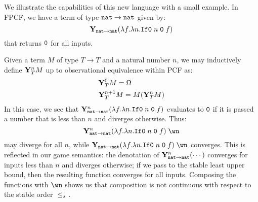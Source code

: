 \documentclass{article}
\begin{document}
\begin{example}
  We illustrate the capabilities of this new language with a small example.  In FPCF, we have a term of type ${\mathtt{nat}}\to{\mathtt{nat}}$ given by:
  \[
    \mathbf{Y}_{{\mathtt{nat}}\to{\mathtt{nat}}}(\lambda f.\lambda n.{\mathtt{If0}\;} n\;{\mathtt{0}}\;f)
    \]
  that returns ${\mathtt{0}}$ for all inputs.

  Given a term $M$ of type $T\to T$ and a natural number $n$, we may inductively define $\mathbf{Y}_T^n M$ up to observational equivalence within PCF as:
  \begin{align*}
    &\mathbf{Y}_T^0 M = \Omega \\
    &\mathbf{Y}_T^{n+1} M = M (\mathbf{Y}_T^n M)
  \end{align*}
  In this case, we see that $\mathbf{Y}_{{\mathtt{nat}}\to{\mathtt{nat}}}^n(\lambda f.\lambda n.{\mathtt{If0}\;} n\;{\mathtt{0}}\;f)$ evaluates to ${\mathtt{0}}$ if it is passed a number that is less than $n$ and diverges otherwise.  Thus:
  \[
    \Y_{\nat\to\nat}^n(\lambda f.\lambda n.\IfO n\;\0\;f)\;\wn
    \]
  may diverge for all $n$, while $\Y_{\nat\to\nat}(\lambda f.\lambda n.\IfO n\;\0\;f)\;\wn$ converges.  This is reflected in our game semantics: the denotation of $\mathbf{Y}_{{\mathtt{nat}}\to{\mathtt{nat}}}^n(\cdots)$ converges for inputs less than $n$ and diverges otherwise; if we pass to the stable least upper bound, then the resulting function converges for all inputs.  Composing the functions with $\wn$ shows us that composition is not continuous with respect to the stable order ${\;\le_s\;}$.


\end{example}
\end{document}
